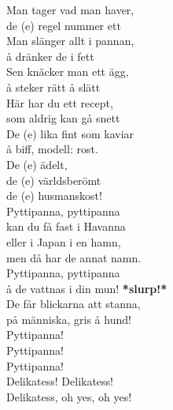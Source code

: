 \begin{minipage}{.45\textwidth}
    Man tager vad man haver,\\
    de (e) regel nummer ett\\
    Man slänger allt i pannan,\\
    å dränker de i fett\\
    Sen knäcker man ett ägg,\\
    å steker rätt å slätt\\
    Här har du ett recept,\\
    som aldrig kan gå snett\\


    De (e) lika fint som kaviar\\
    å biff, modell: rost.\\
    De (e) ädelt,\\
    de (e) världsberömt\\
    de (e) husmanskost!\\


    Pyttipanna, pyttipanna\\
    kan du få fast i Havanna\\
    eller i Japan i en hamn,\\
    men då har de annat namn.\\
    Pyttipanna, pyttipanna\\
    å de vattnas i din mun! \textbf{\small{*slurp!*}}\\
    De får blickarna att stanna,\\
    på människa, gris å hund!\\
    Pyttipanna!\\
    Pyttipanna!\\
    Pyttipanna!\\
    Delikatess! Delikatess!\\
    Delikatess, oh yes, oh yes!\\

\end{minipage}

\newpage

